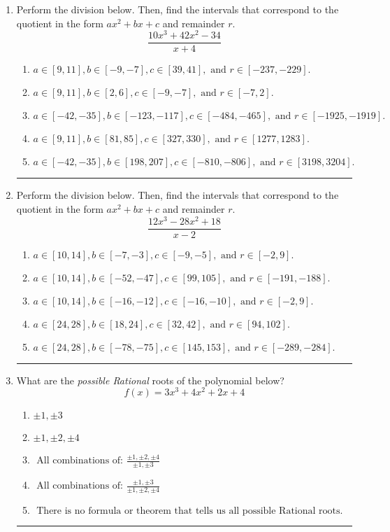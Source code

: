 \documentclass[14pt]{extbook}
\newcommand{\litem}[1]{\item#1\hspace*{-1cm}\rule{\textwidth}{0.4pt}}
\begin{document}
\begin{enumerate}
{\begin{enumerate}[label=\Alph*.]
\end{enumerate} }
\litem{
Perform the division below. Then, find the intervals that correspond to the quotient in the form $ax^2+bx+c$ and remainder $r$.\[ \frac{10x^{3} +42 x^{2} -34}{x + 4} \]\begin{enumerate}[label=\Alph*.]
\item \( a \in [9, 11], b \in [-9, -7], c \in [39, 41], \text{ and } r \in [-237, -229]. \)
\item \( a \in [9, 11], b \in [2, 6], c \in [-9, -7], \text{ and } r \in [-7, 2]. \)
\item \( a \in [-42, -35], b \in [-123, -117], c \in [-484, -465], \text{ and } r \in [-1925, -1919]. \)
\item \( a \in [9, 11], b \in [81, 85], c \in [327, 330], \text{ and } r \in [1277, 1283]. \)
\item \( a \in [-42, -35], b \in [198, 207], c \in [-810, -806], \text{ and } r \in [3198, 3204]. \)

\end{enumerate} }
\litem{
Perform the division below. Then, find the intervals that correspond to the quotient in the form $ax^2+bx+c$ and remainder $r$.\[ \frac{12x^{3} -28 x^{2} + 18}{x -2} \]\begin{enumerate}[label=\Alph*.]
\item \( a \in [10, 14], b \in [-7, -3], c \in [-9, -5], \text{ and } r \in [-2, 9]. \)
\item \( a \in [10, 14], b \in [-52, -47], c \in [99, 105], \text{ and } r \in [-191, -188]. \)
\item \( a \in [10, 14], b \in [-16, -12], c \in [-16, -10], \text{ and } r \in [-2, 9]. \)
\item \( a \in [24, 28], b \in [18, 24], c \in [32, 42], \text{ and } r \in [94, 102]. \)
\item \( a \in [24, 28], b \in [-78, -75], c \in [145, 153], \text{ and } r \in [-289, -284]. \)

\end{enumerate} }
\litem{
What are the \textit{possible Rational} roots of the polynomial below?\[ f(x) = 3x^{3} +4 x^{2} +2 x + 4 \]\begin{enumerate}[label=\Alph*.]
\item \( \pm 1,\pm 3 \)
\item \( \pm 1,\pm 2,\pm 4 \)
\item \( \text{ All combinations of: }\frac{\pm 1,\pm 2,\pm 4}{\pm 1,\pm 3} \)
\item \( \text{ All combinations of: }\frac{\pm 1,\pm 3}{\pm 1,\pm 2,\pm 4} \)
\item \( \text{ There is no formula or theorem that tells us all possible Rational roots.} \)


\end{enumerate}}
\end{enumerate}
\end{document}
